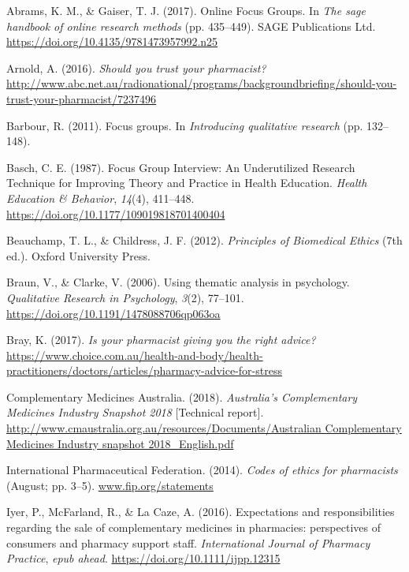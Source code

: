 \documentclass[12pt,]{article}
\begin{document}
\hypertarget{refs}{}
\hypertarget{ref-Gaiser2017}{}
Abrams, K. M., \& Gaiser, T. J. (2017). Online Focus Groups. In
\emph{The sage handbook of online research methods} (pp. 435--449). SAGE
Publications Ltd. \url{https://doi.org/10.4135/9781473957992.n25}

\hypertarget{ref-Arnold2016}{}
Arnold, A. (2016). \emph{Should you trust your pharmacist?}
\url{http://www.abc.net.au/radionational/programs/backgroundbriefing/should-you-trust-your-pharmacist/7237496}

\hypertarget{ref-BarbourFG2011}{}
Barbour, R. (2011). Focus groups. In \emph{Introducing qualitative
research} (pp. 132--148).

\hypertarget{ref-Basch1987}{}
Basch, C. E. (1987). Focus Group Interview: An Underutilized Research
Technique for Improving Theory and Practice in Health Education.
\emph{Health Education \& Behavior}, \emph{14}(4), 411--448.
\url{https://doi.org/10.1177/109019818701400404}

\hypertarget{ref-Beauchamp2012}{}
Beauchamp, T. L., \& Childress, J. F. (2012). \emph{Principles of
Biomedical Ethics} (7th ed.). Oxford University Press.

\hypertarget{ref-Braun2016}{}
Braun, V., \& Clarke, V. (2006). Using thematic analysis in psychology.
\emph{Qualitative Research in Psychology}, \emph{3}(2), 77--101.
\url{https://doi.org/10.1191/1478088706qp063oa}

\hypertarget{ref-Bray2017}{}
Bray, K. (2017). \emph{Is your pharmacist giving you the right advice?}
\url{https://www.choice.com.au/health-and-body/health-practitioners/doctors/articles/pharmacy-advice-for-stress}

\hypertarget{ref-ComplementaryMedicinesAustralia2018}{}
Complementary Medicines Australia. (2018). \emph{Australia's
Complementary Medicines Industry Snapshot 2018} {[}Technical report{]}.
\href{http://www.cmaustralia.org.au/resources/Documents/Australian\%20Complementary\%20Medicines\%20Industry\%20snapshot\%202018_English.pdf}{http://www.cmaustralia.org.au/resources/Documents/Australian Complementary Medicines Industry snapshot 2018\_English.pdf}

\hypertarget{ref-InternationalPharmaceuticalFederation2014}{}
International Pharmaceutical Federation. (2014). \emph{Codes of ethics
for pharmacists} (August; pp. 3--5). \url{www.fip.org/statements}

\hypertarget{ref-Iyer2016a}{}
Iyer, P., McFarland, R., \& La Caze, A. (2016). Expectations and
responsibilities regarding the sale of complementary medicines in
pharmacies: perspectives of consumers and pharmacy support staff.
\emph{International Journal of Pharmacy Practice}, \emph{epub ahead}.
\url{https://doi.org/10.1111/ijpp.12315}
\end{document}
